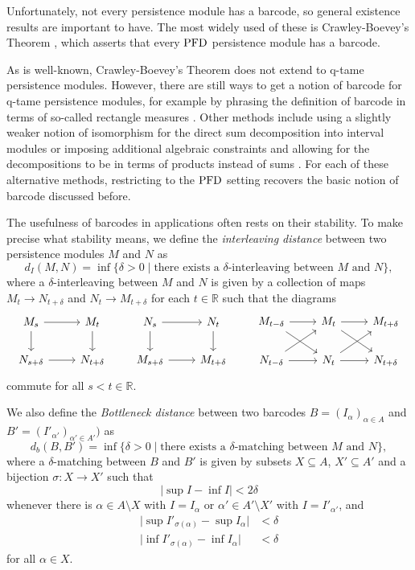 Unfortunately, not every persistence module has a barcode, so general existence results are important to have. The most widely used of these is Crawley-Boevey's Theorem \cite{Crawley-Boevey.2015}, which asserts that every $\mathrm{PFD}$ persistence module has a barcode. 

As is well-known, Crawley-Boevey's Theorem does not extend to q-tame persistence modules. However, there are still ways to get a notion of barcode for q-tame persistence modules, for example by phrasing the definition of barcode in terms of so-called rectangle measures \cite{Chazal.2016a}. Other methods include using a slightly weaker notion of isomorphism for the direct sum decomposition into interval modules \cite{Chazal.2016b} or imposing additional algebraic constraints and allowing for the decompositions to be in terms of products instead of sums \cite{schmahl2020structure}. For each of these alternative methods, restricting to the $\mathrm{PFD}$ setting recovers the basic notion of barcode discussed before.

The usefulness of barcodes in applications often rests on their stability. To make precise what stability means, we define the \emph{interleaving distance} between two persistence modules $M$ and $N$ as 
\[
d_{I}(M,N)=\inf\{\delta>0\mid\text{there exists a }\delta\text{-interleaving between }M\text{ and }N\},
\]
where a $\delta$-interleaving between $M$ and $N$ is given by a collection of maps $M_{t}\to N_{t+\delta}$ and $N_{t}\to M_{t+\delta}$ for each $t\in\mathbb{R}$ such that the diagrams
\[
\begin{tikzcd}
M_s\arrow[r]\arrow[d] & M_t\arrow[d] \\
N_{s+\delta}\arrow[r] & N_{t+\delta}
\end{tikzcd}
\qquad
\begin{tikzcd}
N_s\arrow[r]\arrow[d] & N_t\arrow[d] \\
M_{s+\delta}\arrow[r] & M_{t+\delta}
\end{tikzcd}
\qquad
\begin{tikzcd}
M_{t-\delta}\arrow[rd]\arrow[r]& M_{t}\arrow[rd]\arrow[r] & M_{t+\delta} \\
N_{t-\delta}\arrow[ru]\arrow[r]& N_{t}\arrow[ru]\arrow[r] & N_{t+\delta}
\end{tikzcd}
\]
commute for all $s<t\in\mathbb{R}$.

We also define the \emph{Bottleneck distance} between two barcodes $B=(I_{\alpha})_{\alpha\in A}$ and $B'=(I'_{\alpha'})_{\alpha'\in A'})$ as
\[
d_{b}(B,B')=\inf\{\delta>0\mid\text{there exists a }\delta\text{-matching between }M\text{ and }N\},
\]
where a $\delta$-matching between $B$ and $B'$ is given by subsets $X\subseteq A$, $X'\subseteq A'$ and a bijection $\sigma\colon X\to X'$ such that
\[
\lvert \sup I - \inf I \rvert < 2\delta
\]
whenever there is $\alpha\in A\setminus X$ with $I=I_{\alpha}$ or $\alpha'\in A'\setminus X'$ with $I=I'_{\alpha'}$, and
\begin{align*}
\lvert \sup I'_{\sigma(\alpha)} - \sup I_{\alpha} \rvert &< \delta \\
\lvert \inf I'_{\sigma(\alpha)} - \inf I_{\alpha} \rvert &< \delta
\end{align*}
for all $\alpha\in X$.

